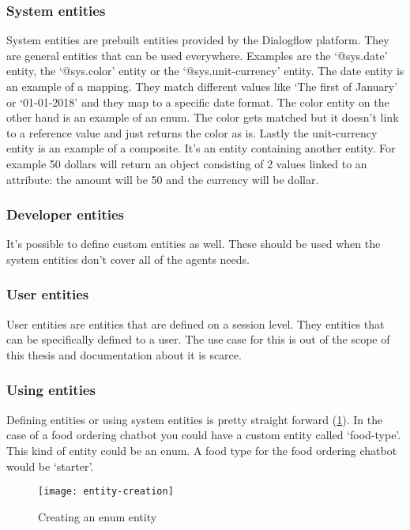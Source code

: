 \subsubsection{System entities}

System entities are prebuilt entities provided by the Dialogflow platform. They are general entities that can be used everywhere. Examples are the `@sys.date' entity, the `@sys.color' entity or the `@sys.unit-currency' entity. The date entity is an example of a mapping. They match different values like `The first of January' or `01-01-2018' and they map to a specific date format. The color entity on the other hand is an example of an enum. The color gets matched but it doesn't link to a reference value and just returns the color as is. Lastly the unit-currency entity is an example of a composite. It's an entity containing another entity. For example 50 dollars will return an object consisting of 2 values linked to an attribute: the amount will be 50 and the currency will be dollar.

\subsubsection{Developer entities}

It's possible to define custom entities as well. These should be used when the system entities don't cover all of the agents needs.

\subsubsection{User entities}

User entities are entities that are defined on a session level. They entities that can be specifically defined to a user. The use case for this is out of the scope of this thesis and documentation about it is scarce.

\subsubsection{Using entities}

Defining entities or using system entities is pretty straight forward (\ref{fig:entity-creation}). In the case of a food ordering chatbot you could have a custom entity called `food-type'. This kind of entity could be an enum. A food type for the food ordering chatbot would be `starter'.

\begin{figure}[ht]
	\centering
	\texttt{[image: entity-creation]}\label{fig:entity-creation}
	\caption{Creating an enum entity}
\end{figure}

